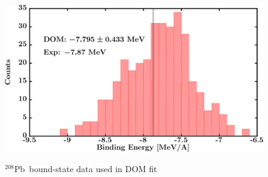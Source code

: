 \documentclass[twocolumn,secnumarabic,amssymb, nobibnotes, aps, prl,
superscriptaddress, nobalancelastpage, draft]{revtex4}
\newcommand{\pbEight}{\ensuremath{^{208}}P\lowercase{b}}
\begin{document}
\begin{figure}[!htb]
\begin{minipage}{0.4\linewidth}
        \label{DOM_pb208_RMSRadius}
    \end{minipage}
    \begin{minipage}{0.4\linewidth}
        \centering
        \includegraphics[width=\linewidth]{figures/pb208_BE.png}
        \label{DOM_pb208_BE}
    \end{minipage}
    \caption{\pbEight\ bound-state data used in DOM fit}
    \label{DOM_pb208_structural}
\end{figure}
\end{document}
